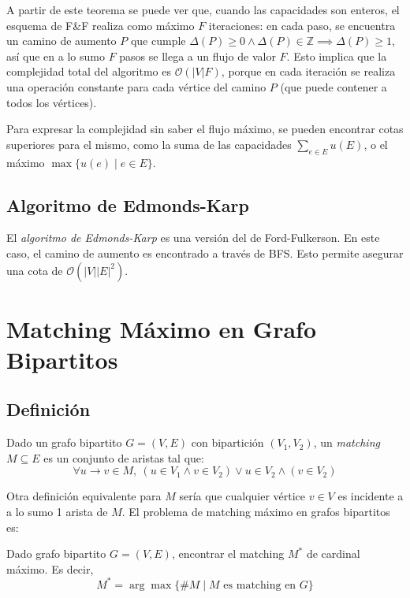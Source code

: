 \documentclass[a4paper]{report}
\newcommand{\BigO}[1]{\ensuremath{\mathcal{O}(#1)}}
\newcommand{\Z}{\mathbb{Z}}
\begin{document}
A partir de este teorema se puede ver que, cuando las capacidades son enteros, el esquema de F\&F realiza como máximo $F$ iteraciones: en cada paso, se encuentra un camino de aumento $P$ que cumple $\Delta(P) \geq 0 \land \Delta(P) \in \Z \implies \Delta(P) \geq 1$, así que en a lo sumo $F$ pasos se llega a un flujo de valor $F$. Esto implica que la complejidad total del algoritmo es \BigO{|V|F}, porque en cada iteración se realiza una operación constante para cada vértice del camino $P$ (que puede contener a todos los vértices).

Para expresar la complejidad sin saber el flujo máximo, se pueden encontrar cotas superiores para el mismo, como la suma de las capacidades $\sum_{e \in E} u(E)$, o el máximo $\max{\{u(e) \mid e \in E\}}$.

\subsection{Algoritmo de Edmonds-Karp}
\label{edmonds-karp}

El \textit{algoritmo de Edmonds-Karp} es una versión del de Ford-Fulkerson. En este caso, el camino de aumento es encontrado a través de BFS. Esto permite asegurar una cota de \BigO{|V||E|^2}.

\section{Matching Máximo en Grafo Bipartitos}

\subsection{Definición}

Dado un grafo bipartito $G = (V, E)$ con bipartición $(V_1, V_2)$, un \textit{matching} $M \subseteq E$ es un conjunto de aristas tal que:
    $$\forall u \rightarrow v \in M,\ (u \in V_1 \land v \in V_2) \lor u \in V_2 \land (v \in V_2)$$

Otra definición equivalente para $M$ sería que cualquier vértice $v \in V$ es incidente a a lo sumo 1 arista de $M$. El problema de matching máximo en grafos bipartitos es:

\begin{problema}
    Dado grafo bipartito $G = (V, E)$, encontrar el matching $M^*$ de cardinal máximo. Es decir,
    $$M^* = \arg\max{\{\#M \mid M \text{ es matching en } G\}}$$
\end{problema}
\end{document}
